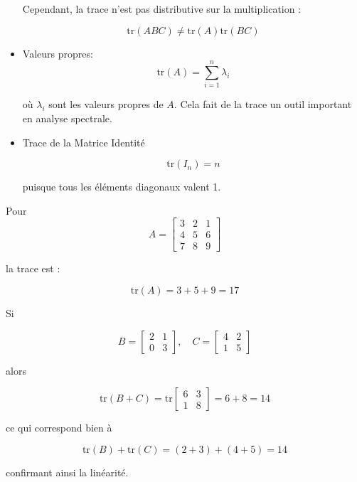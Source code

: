 \begin{appendices}
\begin{property}
\begin{itemize}
                Cependant, la trace n'est pas distributive sur la multiplication :

                \[
                    \text{tr}(A B C) \neq \text{tr}(A) \text{tr}(B C)
                \]
            \item Valeurs propres:
                \[
                    \text{tr}(A) = \sum_{i=1}^{n} \lambda_i
                \]

                où \( \lambda_i \) sont les valeurs propres de \( A \). Cela fait de la trace un outil important en analyse spectrale.

            \item Trace de la Matrice Identité

                \[
                    \text{tr}(I_n) = n
                \]

                puisque tous les éléments diagonaux valent 1.
       \end{itemize} 
    \end{property}
    \begin{eg}
        Pour
        \[
            A = \begin{bmatrix} 3 & 2 & 1 \\ 4 & 5 & 6 \\ 7 & 8 & 9 \end{bmatrix}
        \]

        la trace est :

        \[
            \text{tr}(A) = 3 + 5 + 9 = 17
        \] 
    \end{eg}
    \begin{eg}
        Si

        \[
            B = \begin{bmatrix} 2 & 1 \\ 0 & 3 \end{bmatrix}, \quad C = \begin{bmatrix} 4 & 2 \\ 1 & 5 \end{bmatrix}
        \]

        alors

        \[
            \text{tr}(B + C) = \text{tr} \begin{bmatrix} 6 & 3 \\ 1 & 8 \end{bmatrix} = 6 + 8 = 14
        \]

        ce qui correspond bien à 

        \[
            \text{tr}(B) + \text{tr}(C) = (2+3) + (4+5) = 14
        \]

        confirmant ainsi la linéarité. 
    \end{eg}
\end{appendices}
